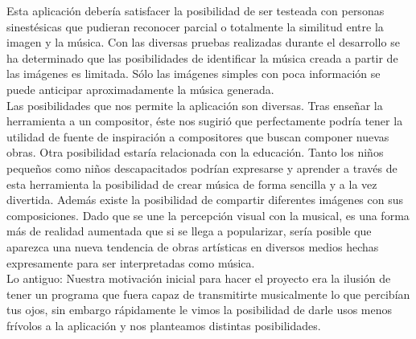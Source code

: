Esta aplicación debería satisfacer la posibilidad de ser testeada con personas sinestésicas que pudieran reconocer parcial o totalmente la similitud entre la imagen y la música. Con las diversas pruebas realizadas durante el desarrollo se ha determinado que las posibilidades de identificar la música creada a partir de las imágenes es limitada. Sólo las imágenes simples con poca información se puede anticipar aproximadamente la música generada.\\

Las posibilidades que nos permite la aplicación son diversas. Tras enseñar la herramienta a un compositor, éste nos sugirió que perfectamente podría tener la utilidad de fuente de inspiración a compositores que buscan componer nuevas obras. Otra posibilidad estaría relacionada con la educación. Tanto los niños pequeños como niños descapacitados podrían expresarse y aprender a través de esta herramienta la posibilidad de crear música de forma sencilla y a la vez divertida. Además existe la posibilidad de compartir diferentes imágenes con sus composiciones.
Dado que se une la percepción visual con la musical, es una forma más de realidad aumentada que si se llega a popularizar, sería posible que aparezca una nueva tendencia de obras artísticas en diversos medios hechas expresamente para ser interpretadas como música.\\

\color{red} Lo antiguo:
Nuestra motivación inicial para hacer el proyecto era la ilusión de tener un programa que fuera capaz de transmitirte musicalmente lo que percibían tus ojos, sin embargo rápidamente le vimos la posibilidad de darle usos menos frívolos a la aplicación y nos planteamos distintas posibilidades.\\

